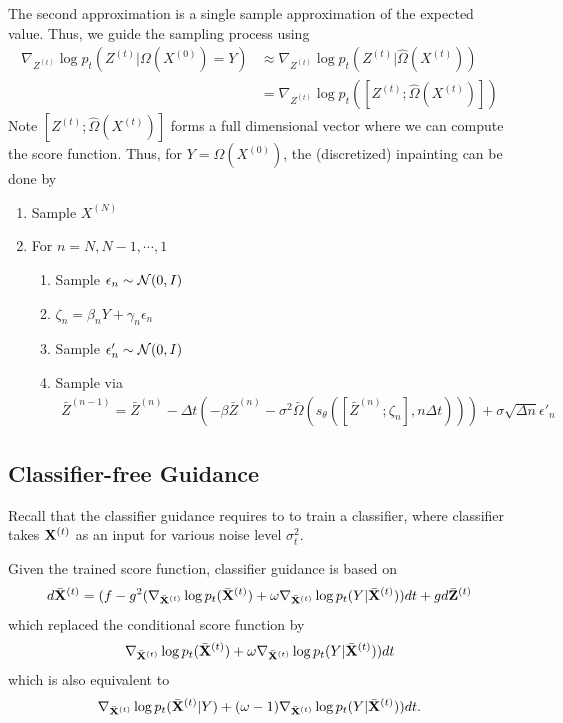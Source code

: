 \documentclass[11pt, a4paper]{article}
\begin{document}
The second approximation is a single sample approximation of the expected value.
Thus, we guide the sampling process using
\begin{align}
    \nabla_{Z^{(t)}} \log p_t(Z^{(t)}|\Omega(X^{(0)})=Y) 
    &\approx \nabla_{Z^{(t)}} \log p_t(Z^{(t)}|\hat{\Omega}(X^{(t)}))\\
    &= \nabla_{Z^{(t)}} \log p_t([Z^{(t)};\hat{\Omega}(X^{(t)})])
\end{align}
Note $[Z^{(t)};\hat{\Omega}(X^{(t)})]$ forms a full dimensional vector where we can compute the score function.
Thus, for $Y = \Omega(X^{(0)})$, the (discretized) inpainting can be done by
\begin{enumerate}
    \item Sample  $X^{(N)}$
    \item For $n = N, N-1, \cdots, 1$
    \begin{enumerate}
        \item Sample $\epsilon_n \sim {\cal N}(0, I)$
        \item $\zeta_n = \beta_n Y + \gamma_n \epsilon_n$
        \item Sample $\epsilon'_n \sim {\cal N}(0, I)$
        \item Sample via
        \begin{align}
            \bar{Z}^{(n-1)} = \bar{Z}^{(n)} - \Delta t (-\beta \bar{Z}^{(n)} - \sigma^2 \bar{\Omega}(s_{\theta}([\bar{Z}^{(n)}; \zeta_n], n\Delta t)))
                +\sigma\sqrt{\Delta n}\epsilon'_n
        \end{align}
    \end{enumerate}
\end{enumerate}


\subsection{Classifier-free Guidance~\cite{ho2022classifier}}
Recall that the classifier guidance requires to to train a classifier,
where classifier takes ${\bf X}^{(t)}$ as an input for various noise level $\sigma^2_t$.

Given the trained score function, classifier guidance is based on 
\begin{align}
    d\bar{{\bf X}}^{(t)} = (f - g^2 (\nabla_{\bar{{\bf X}}^{(t)}} \log p_t (\bar{{\bf X}}^{(t)}) 
    + \omega \nabla_{\bar{{\bf X}}^{(t)}} \log p_t (Y|\bar{{\bf X}}^{(t)}))dt + g d\bar{{\bf Z}}^{(t)}
\end{align}
which replaced the conditional score function by
\begin{align}
\nabla_{\bar{{\bf X}}^{(t)}} \log p_t (\bar{{\bf X}}^{(t)} ) + \omega \nabla_{\bar{{\bf X}}^{(t)}} \log p_t (Y|\bar{{\bf X}}^{(t)}))dt
\end{align}
which is also equivalent to
\begin{align}
\nabla_{\bar{{\bf X}}^{(t)}} \log p_t (\bar{{\bf X}}^{(t)} |Y ) + (\omega-1) \nabla_{\bar{{\bf X}}^{(t)}} \log p_t (Y|\bar{{\bf X}}^{(t)}))dt.
\end{align}
\end{document}
